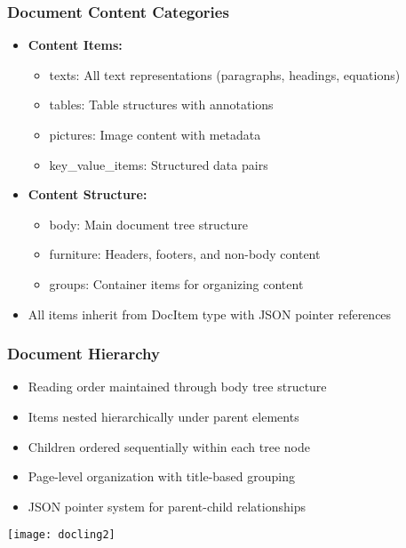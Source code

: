 \begin{frame}[fragile]\frametitle{Document Content Categories}
      \begin{itemize}
	\item \textbf{Content Items:}
	\begin{itemize}
		\item texts: All text representations (paragraphs, headings, equations)
		\item tables: Table structures with annotations
		\item pictures: Image content with metadata
		\item key\_value\_items: Structured data pairs
	\end{itemize}
	\item \textbf{Content Structure:}
	\begin{itemize}
		\item body: Main document tree structure
		\item furniture: Headers, footers, and non-body content
		\item groups: Container items for organizing content
	\end{itemize}
	\item All items inherit from DocItem type with JSON pointer references
	  \end{itemize}
\end{frame}

\begin{frame}[fragile]\frametitle{Document Hierarchy}

      \begin{itemize}
		\item Reading order maintained through body tree structure
		\item Items nested hierarchically under parent elements
		\item Children ordered sequentially within each tree node
		\item Page-level organization with title-based grouping
		\item JSON pointer system for parent-child relationships
	  \end{itemize}


		\begin{center}
		\texttt{[image: docling2]}
		\end{center}	

\end{frame}

